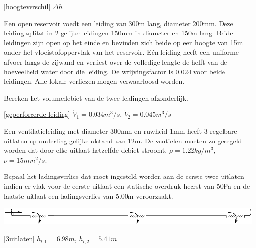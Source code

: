 \begin{antwoord}{\ref{hoogteverschil}}
	$\Delta h = $
\end{antwoord}
\begin{toepassing}
	\label{geperforeerde leiding}
Een open reservoir voedt een leiding van 300m lang, diameter 200mm. Deze leiding splitst in 2 gelijke leidingen 150mm in diameter en 150m lang. Beide leidingen zijn open op het einde en bevinden zich beide op een hoogte van 15m onder het vloeistofoppervlak van het reservoir. Eén leiding heeft een uniforme afvoer langs de zijwand en verliest over de volledige lengte de helft van de hoeveelheid water door die leiding. De wrijvingsfactor is 0.024 voor beide leidingen. Alle lokale verliezen mogen verwaarloosd worden.
		
Bereken het volumedebiet van de twee leidingen afzonderlijk. 
\end{toepassing}
\begin{antwoord}{\ref{geperforeerde leiding}}
	$\dot{V}_1 = 0.034\unit{m^3/s}$, $\dot{V}_2 = 0.045\unit{m^3/s}$
\end{antwoord}
\begin{toepassing}
	\label{3uitlaten}
Een ventilatieleiding met diameter 300mm en ruwheid 1mm heeft 3 regelbare uitlaten op onderling gelijke afstand van 12m. De ventielen moeten zo geregeld worden dat door elke uitlaat hetzelfde debiet stroomt. $\rho = 1.22\unit{kg/m^3}$, $\nu = 15\unit{mm^2/s}$.
	
Bepaal het ladingsverlies dat moet ingesteld worden aan de eerste twee uitlaten indien er vlak voor de eerste uitlaat een statische overdruk heerst van 50Pa en de laatste uitlaat een ladingsverlies van 5.00m veroorzaakt.

	\centering
	\includegraphics{fig/leidingnetwerken/3uitlaten}
\end{toepassing}
\begin{antwoord}{\ref{3uitlaten}}
	$h_{l,1} = 6.98\unit{m}$, $h_{l,2} = 5.41\unit{m}$
\end{antwoord}
